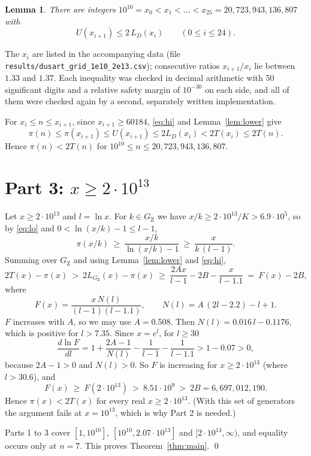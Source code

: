 \documentclass[11pt]{article}
\newtheorem{lemma}[theorem]{Lemma}
\theoremstyle{remark}
\newcommand{\GZ}{G_{\mathrm{Z}}}
\begin{document}
\begin{lemma}\label{lem:grid}
There are integers $10^{10} = x_0 < x_1 < \dots < x_{25} = 20{,}723{,}943{,}136{,}807$ with
\[
U(x_{i+1}) \le 2\,L_D(x_i) \qquad (0 \le i \le 24).
\]
\end{lemma}

The $x_i$ are listed in the accompanying data (file \texttt{results/dusart\_grid\_1e10\_2e13.csv}); consecutive ratios $x_{i+1}/x_i$ lie between $1.33$ and $1.37$. Each inequality was checked in decimal arithmetic with 50 significant digits and a relative safety margin of $10^{-30}$ on each side, and all of them were checked again by a second, separately written implementation.

For $x_i \le n \le x_{i+1}$, since $x_{i+1} \ge 60184$, \eqref{eq:hi} and Lemma~\ref{lem:lower} give
\[
\pi(n) \le \pi(x_{i+1}) \le U(x_{i+1}) \le 2L_D(x_i) < 2T(x_i) \le 2T(n).
\]
Hence $\pi(n) < 2T(n)$ for $10^{10} \le n \le 20{,}723{,}943{,}136{,}807$.

\section{Part 3: \texorpdfstring{$x \ge 2\cdot 10^{13}$}{x >= 2*10^13}}\label{sec:part3}

Let $x \ge 2\cdot 10^{13}$ and $l = \ln x$. For $k \in \GZ$ we have $x/k \ge 2\cdot 10^{13}/K > 6.9\cdot 10^{5}$, so by \eqref{eq:lo} and $0 < \ln(x/k) - 1 \le l - 1$,
\[
\pi(x/k) \ \ge\ \frac{x/k}{\ln(x/k) - 1} \ \ge\ \frac{x}{k\,(l - 1)} .
\]
Summing over $\GZ$ and using Lemma~\ref{lem:lower} and \eqref{eq:hi},
\[
2T(x) - \pi(x) \ >\ 2L_{\GZ}(x) - \pi(x) \ \ge\ \frac{2Ax}{l - 1} - 2B - \frac{x}{l - 1.1} \ =\ F(x) - 2B,
\]
where
\[
F(x) = \frac{x\,N(l)}{(l - 1)(l - 1.1)}, \qquad N(l) = A\,(2l - 2.2) - l + 1 .
\]
$F$ increases with $A$, so we may use $A = 0.508$. Then $N(l) = 0.016\,l - 0.1176$, which is positive for $l > 7.35$. Since $x = e^{l}$, for $l \ge 30$
\[
\frac{d \ln F}{d l} = 1 + \frac{2A - 1}{N(l)} - \frac{1}{l - 1} - \frac{1}{l - 1.1} > 1 - 0.07 > 0,
\]
because $2A - 1 > 0$ and $N(l) > 0$. So $F$ is increasing for $x \ge 2\cdot 10^{13}$ (where $l > 30.6$), and
\[
F(x) \ \ge\ F(2\cdot 10^{13}) \ >\ 8.51\cdot 10^{9} \ >\ 2B = 6{,}697{,}012{,}190 .
\]
Hence $\pi(x) < 2T(x)$ for every real $x \ge 2\cdot 10^{13}$. (With this set of generators the argument fails at $x = 10^{13}$, which is why Part 2 is needed.)

\medskip
Parts 1 to 3 cover $[1, 10^{10}]$, $[10^{10}, 2.07\cdot 10^{13}]$ and $[2\cdot 10^{13}, \infty)$, and equality occurs only at $n = 7$. This proves Theorem~\ref{thm:main}. \qed
\end{document}
